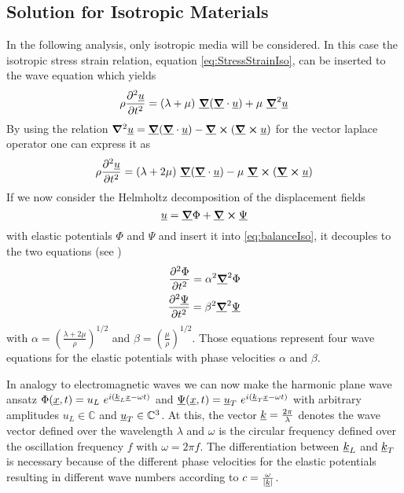 
\subsection{Solution for Isotropic Materials}
\label{sec:IsoSolution}
In the following analysis, only isotropic media will be considered. In this
case the isotropic stress strain relation, equation
\ref{eq:StressStrainIso}, can be inserted to the wave equation which
yields
\begin{equation}
    \rho \ddiff{\uline{u}}{t} = (\lambda + \mu)\ \uline{\gradient}
    (\uline{\gradient}\cdot \uline{u}) + \mu\ \uline{\gradient}^2 \uline{u}
\end{equation}
By using the relation $\gradient^2 \uline u = \uline{\gradient}
    (\uline{\gradient}\cdot \uline{u}) - \uline{\gradient}
    \cross(\uline{\gradient} \cross \uline{u})$ for the vector laplace operator
one can express it as
\begin{equation} \label{eq:balanceIso}
    \rho \ddiff{\uline{u}}{t} = (\lambda + 2\mu)\ \uline{\gradient}
    (\uline{\gradient}\cdot \uline{u})- \mu\ \uline{\grad }
    \cross (\uline{\gradient}\cross \uline{u})
\end{equation}
If we now consider the Helmholtz decomposition of the displacement fields
\begin{equation} \label{eq:Helmholtz}
    \uline{u} = \uline{\gradient}\Phi + \uline{\gradient}\cross \uline{\Psi}
\end{equation}
with elastic potentials $\Phi$ and $\Psi$ and insert it into
\ref{eq:balanceIso},
it decouples to the two equations (see \cite{BedfordElasticWaves})
\begin{align}
    \ddiff{\Phi}{t} = \alpha^2 \uline{\gradient}^2\Phi \\
    \ddiff{\uline{\Psi}}{t} = \beta^2 \uline{\gradient}^2\uline{\Psi}
\end{align}
with $\alpha = \left(\frac{\lambda + 2\mu}{\rho}\right)^{1/2}$ and $\beta =
    \left(\frac{\mu}{\rho}\right)^{1/2}$. Those equations represent four wave
equations for the elastic potentials with phase velocities $\alpha$ and
$\beta$.

In analogy to electromagnetic waves we can now make the harmonic
plane wave ansatz $\Phi(\underline{x}, t)= u_L\
    e^{i(\underline{k}_L \underline{x}-\omega t)}$ and $\underline{\Psi}(\underline{x}, t)
    =
    \underline{u}_T \ e^{i(\underline{k}_T\underline{x}-\omega t)}$ with arbitrary
amplitudes $u_L\in\mathbb{C}$ and $\underline{u}_T\in \mathbb{C}^3$.
At this, the vector
$\underline{k}=\frac{2\pi}{\lambda}$ denotes the wave vector defined over the
wavelength $\lambda$ and $\omega$ is the circular frequency defined over the
oscillation frequency $f$ with	$\omega = 2 \pi f$. The differentiation between
$\underline{k}_L$ and $\underline{k}_T$ is necessary because of the different
phase velocities for the elastic potentials resulting in different wave numbers
according to $c = \frac{\omega}{|\underline{k}|}$.


